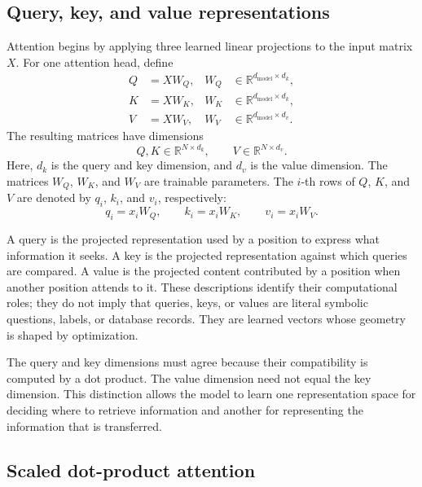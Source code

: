 \subsection{Query, key, and value representations}
\label{subsec:attn-qkv-representations}

Attention begins by applying three learned linear projections to the input
matrix \(X\). For one attention head, define
\begin{align}
    Q &= XW_Q,
    & W_Q&\in\mathbb{R}^{d_{\mathrm{model}}\times d_k},
    \label{eq:attn-query-projection}\\
    K &= XW_K,
    & W_K&\in\mathbb{R}^{d_{\mathrm{model}}\times d_k},
    \label{eq:attn-key-projection}\\
    V &= XW_V,
    & W_V&\in\mathbb{R}^{d_{\mathrm{model}}\times d_v}.
    \label{eq:attn-value-projection}
\end{align}
The resulting matrices have dimensions
\begin{equation}
    Q,K\in\mathbb{R}^{N\times d_k},
    \qquad
    V\in\mathbb{R}^{N\times d_v}.
    \label{eq:attn-qkv-shapes}
\end{equation}
Here, \(d_k\) is the query and key dimension, and \(d_v\) is the value
dimension. The matrices \(W_Q\), \(W_K\), and \(W_V\) are trainable
parameters. The \(i\)-th rows of \(Q\), \(K\), and \(V\) are denoted by
\(q_i\), \(k_i\), and \(v_i\), respectively:
\begin{equation}
    q_i=x_iW_Q,\qquad
    k_i=x_iW_K,\qquad
    v_i=x_iW_V.
    \label{eq:attn-qkv-token}
\end{equation}

A query is the projected representation used by a position to express what
information it seeks. A key is the projected representation against which
queries are compared. A value is the projected content contributed by a
position when another position attends to it. These descriptions identify
their computational roles; they do not imply that queries, keys, or values
are literal symbolic questions, labels, or database records. They are learned
vectors whose geometry is shaped by optimization.

The query and key dimensions must agree because their compatibility is
computed by a dot product. The value dimension need not equal the key
dimension. This distinction allows the model to learn one representation
space for deciding where to retrieve information and another for representing
the information that is transferred.

\subsection{Scaled dot-product attention}
\label{subsec:attn-scaled-dot-product}


